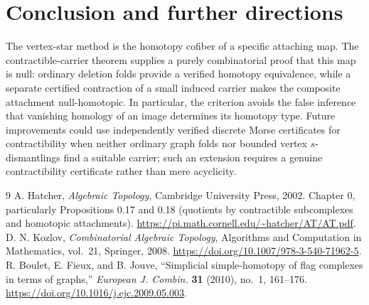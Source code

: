 \documentclass[11pt,letterpaper]{article}
\theoremstyle{definition}
\theoremstyle{remark}
\begin{document}
\section{Conclusion and further directions}
The vertex-star method is the homotopy cofiber of a specific attaching map. The contractible-carrier theorem supplies a purely combinatorial proof that this map is null: ordinary deletion folds provide a verified homotopy equivalence, while a separate certified contraction of a small induced carrier makes the composite attachment null-homotopic. In particular, the criterion avoids the false inference that vanishing homology of an image determines its homotopy type. Future improvements could use independently verified discrete Morse certificates for contractibility when neither ordinary graph folds nor bounded vertex \(s\)-dismantlings find a suitable carrier; such an extension requires a genuine contractibility certificate rather than mere acyclicity.

\begin{thebibliography}{9}
 A. Hatcher, \emph{Algebraic Topology}, Cambridge University Press, 2002. Chapter 0, particularly Propositions 0.17 and 0.18 (quotients by contractible subcomplexes and homotopic attachments). \url{https://pi.math.cornell.edu/~hatcher/AT/AT.pdf}.
 D. N. Kozlov, \emph{Combinatorial Algebraic Topology}, Algorithms and Computation in Mathematics, vol.~21, Springer, 2008. \url{https://doi.org/10.1007/978-3-540-71962-5}.
 R. Boulet, E. Fieux, and B. Jouve, ``Simplicial simple-homotopy of flag complexes in terms of graphs,'' \emph{European J. Combin.} \textbf{31} (2010), no.~1, 161--176. \url{https://doi.org/10.1016/j.ejc.2009.05.003}.
\end{thebibliography}
\end{document}
